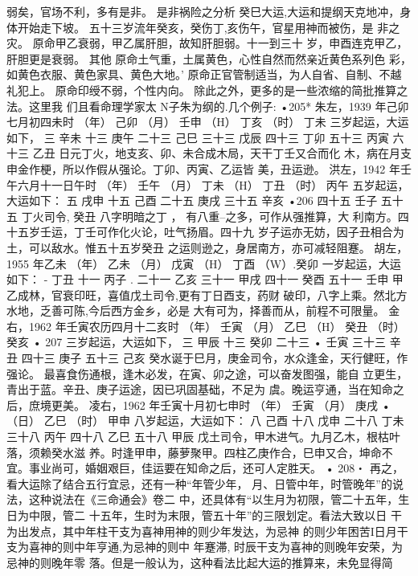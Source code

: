 弱矣，官场不利，多有是非。
是非祸险之分析
癸巳大运,大运和提纲天克地冲，身体开始走下坡。
五十三岁流年癸亥，癸伤丁,亥伤午，官星用神而被伤，是
非之灾。
原命甲乙衰弱，甲乙属肝胆，故知肝胆弱。十一到三十
岁，申酉连克甲乙，肝胆更是衰弱。
其他
原命土气重，土属黄色，心性自然而然亲近黄色系列色
彩，如黄色衣服、黄色家具、黄色大地。’
原命正官管制适当，为人自省、自制、不越礼犯上。
原命印绶不弱，个性内向。
除此之外，更多的是一些浓缩的简批推算之法。这里我
们且看命理学家太 N子朱为纲的.几个例子:
•205*
朱左，1939 年己卯七月初四未时
（年） 己卯
（月） 壬申
（H） 丁亥
（时） 丁未
三岁起运，大运如下，
三 辛未
十三 庚午
二十三 己巳
三十三 戊辰
四十三 丁卯
五十三 丙寅
六十三 乙丑
日元丁火，地支亥、卯、未合成木局，天干丁壬又合而化
木，病在月支申金作梗，所以作假从强论。丁卯、丙寅、乙运皆
美，丑运逊。
洪左，1942 年壬午六月十一日午时
（年） 壬午
（月） 丁未
（H） 丁丑
（时） 丙午
五岁起运，大运如下：
五 戌申
十五 己酉
二十五 庚戌
三十五 辛亥
•206
四十五 壬子
五十五
丁火司令,
癸丑
八字明暗之丁
，
有八重--之多，可作从强推算，大
利南方。四十五岁壬运，丁壬可作化火论，吐气扬眉。四十九
岁子运亦无妨，因子丑相合为土，可以敌水。惟五十五岁癸丑
之运则逊之，身居南方，亦可减轻阻蹇。
胡左，1955 年乙未
（年） 乙未
（月） 戊寅
（H） 丁酉
（W）.癸卯
一岁起运，大运如下：
-
丁丑
十一 丙子 .
二十一 乙亥
三十一 甲戌
四十一 癸酉
五十一 壬申
甲乙成林，官衰印旺，喜值戊土司令,更有丁日酉支，药财
破印，八字上乘。然北方水地，乏善可陈,今后西方金乡，必是
大有可为，择善而从，前程不可限量。
金右，1962 年壬寅农历四月十二亥时
（年） 壬寅
（月） 乙巳
（H） 癸丑
（时） 癸亥
• 207
三岁起运，大运如下，
三 甲辰
十三 癸卯
二十三
•
壬寅
三十三 辛丑
四十三 庚子
五十三 己亥
癸水诞于巳月，庚金司令，水众逢金，天行健旺，作强论。
最喜食伤通根，逢木必发，在寅、卯之途，可以奋发图强，能自
立更生，青出于蓝。辛丑、庚子运途，因已巩固基础，不足为
虞。晚运亨通，当在知命之后，庶境更美。
凌右，1962 年壬寅十月初七申时
（年） 壬寅
（月） 庚戌 •
（日） 乙巳
（时） 甲申
八岁起运，大运如下：
八 己酉
十八 戊申
二十八 丁未
三十八 丙午
四十八 乙巳
五十八 甲辰
戊土司令，甲木进气。九月乙木，根枯叶落，须赖癸水滋
养。时逢甲申，藤萝聚甲。四柱乙庚作合，巳申又合，坤命不
宜。事业尚可，婚姻艰巨，佳运要在知命之后，还可人定胜天。
• 208・
再之，看大运除了结合五行宜忌，还有一种“年管少年，
月、日管中年，时管晚年”的说法，这种说法在《三命通会》卷二
中，还具体有“以生月为初限，管二十五年，生日为中限，管二
十五年，生时为末限，管五十年”的三限划定。看法大致以日
干为出发点，其中年柱干支为喜神用神的则少年发达，为忌神
的则少年困苦I日月干支为喜神的则中年亨通,为忌神的则中
年蹇滞, 时辰干支为喜神的则晚年安荣，为忌神的则晚年零
落。但是一般认为，这种看法比起大运的推算来，未免显得简
